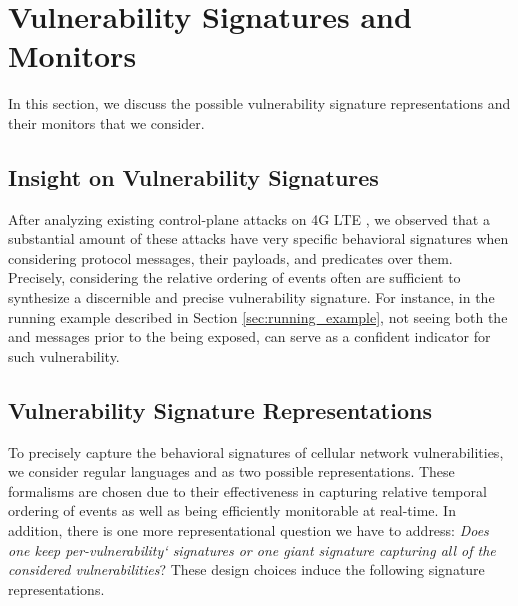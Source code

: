 \section{Vulnerability Signatures and Monitors}
\label{sec:approaches}
In this section, we discuss the possible vulnerability signature representations and their monitors that we consider.

\subsection{Insight on Vulnerability Signatures}
After analyzing existing control-plane attacks on 4G LTE \cite{lteinspector, TORPEDO, privacy_ndss16, kim_ltefuzz_sp19,
5Gformal_authentication_basin, 5g_reasoner, lte_redirection, how_not_to_break_crypto}, we observed that
a substantial amount of these attacks have very specific behavioral signatures
when considering protocol messages, their payloads, and predicates over them.
Precisely, considering the relative ordering of events often are sufficient
to synthesize a discernible and precise vulnerability signature. For instance,
in the running example described in Section \ref{sec:running_example},
not seeing both the \securityModeCommand and \securityModeComplete
messages prior to the \rlfReport being exposed,
can serve as a confident indicator for such vulnerability.


\subsection{Vulnerability Signature Representations}
To precisely capture the behavioral signatures of cellular network vulnerabilities,
we consider regular languages and \pltl as two possible representations.
These formalisms are chosen
due to their effectiveness in capturing relative temporal ordering of events
as well as being efficiently monitorable at real-time. In addition, there is one
more representational question we have to address: \emph{Does one keep per-vulnerability`
signatures or one giant signature capturing all of the considered vulnerabilities}? These
design choices induce the following
signature representations.


